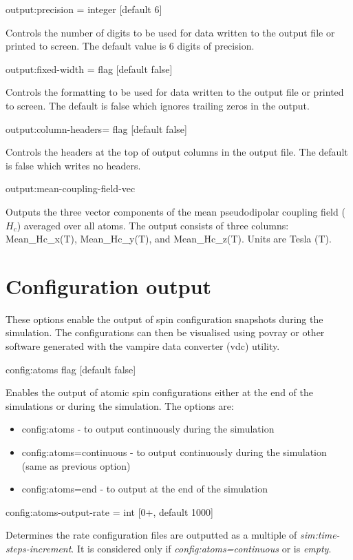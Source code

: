 {\zicf output:precision = integer [default 6]} Controls the number of digits to be used for data written to the output file or printed to screen. The default value is 6 digits of precision.

{\zicf output:fixed-width = flag [default false]} Controls the formatting to be used for data written to the output file or printed to screen. The default is false which ignores trailing zeros in the output.

{\zicf output:column-headers= flag [default false]} Controls the headers at the top of output columns in the output file. The default is false which writes no headers.

{\zicf output:mean-coupling-field-vec}Outputs the three vector components of the mean pseudodipolar coupling field ($H_c$) averaged over all atoms. The output consists of three columns: Mean\_Hc\_x(T), Mean\_Hc\_y(T), and Mean\_Hc\_z(T). Units are Tesla (T).


\section*{Configuration output}
 These options enable the output of spin configuration snapshots during the simulation. The configurations can then be visualised using povray or other software generated with the vampire data converter (vdc) utility.

{\zicf config:atoms flag [default false]} Enables the output of atomic spin configurations either at the end of the simulations or during the simulation. The options are:

\begin{itemize}
  \item[] config:atoms - to output continuously during the simulation
  \item[] config:atoms=continuous - to output continuously during the simulation (same as previous option)
  \item[] config:atoms=end - to output at the end of the simulation
\end{itemize}

{\zicf config:atoms-output-rate = int [0+, default 1000]} Determines the rate configuration files are outputted as a multiple of \textit{sim:time-steps-increment}. It is considered only if \textit{config:atoms=continuous} or is \textit{empty}.

